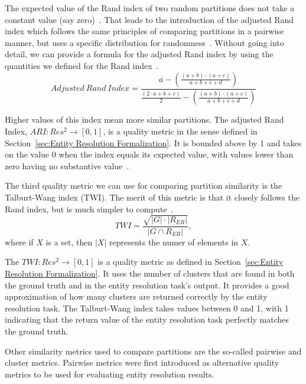 The expected value of the Rand index of two random partitions does not take
a constant value (say zero)~\cite{adjrand2001}.
That leads to the introduction of the adjusted Rand index which follows the
same principles of comparing partitions in a pairwise manner, but uses a
specific distribution for randomness~\cite{adjrand1985}.
Without going into detail, we can provide a formula for the adjusted Rand
index by using the quantities we defined for the Rand index~\cite{Tal11}.
\[
    Adjusted~Rand~Index = \frac{
        a -\left(\frac{(a+b)\cdot(a+c)}{a+b+c+d}\right)
    }{
        \frac{(2\cdot a+b+c)}{2}-\left(\frac{(a+b)\cdot(a+c)}{a+b+c+d}\right)
    }
\]

Higher values of this index mean more similar partitions.
The adjusted Rand Index, $ARI : Res^2 \rightarrow \left[0, 1\right]$, is a
quality metric in the sense defined in Section~\ref{sec:Entity Resolution Formalization}.
It is bounded above by 1 and takes on the value 0 when the index equals its
expected value, with values lower than zero having no substantive
value~\cite{adjrand1985}.

The third quality metric we can use for comparing partition similarity is
the Talburt-Wang index (TWI).
The merit of this metric is that it closely follows the Rand index, but is
much simpler to compute~\cite{Tal11}.
\[
    TWI = \frac{\sqrt{|G|\cdot|R_{ER}|}}{|G \cap R_{ER}|},
\]
where if $X$ is a set, then $|X|$ represents the numer of elements in $X$. 

The $TWI: Res^2 \rightarrow \left[0, 1\right]$ is a quality metric as defined in
Section~\ref{sec:Entity Resolution Formalization}.
It uses the number of clusters that are found in both the ground truth and in
the entity resolution task's output.
It provides a good approximation of how many clusters are returned correctly
by the entity resolution task.
The Talburt-Wang index takes values between 0 and 1, with 1 indicating that
the return value of the entity resolution task perfectly matches the ground
truth.

Other similarity metrics used to compare partitions are the so-called pairwise
and cluster metrics.
Pairwise metrics were first introduced as alternative quality metrics to be used
for evaluating entity resolution results\cite{Men10}.

